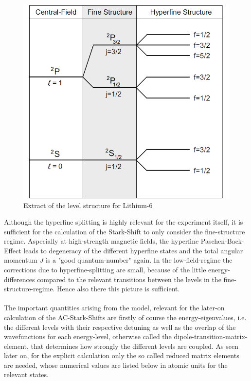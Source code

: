 \begin{figure}[H]

\begin{center}
\includegraphics[scale=.5] {levels1}
\end{center}
\caption{Extract of the level structure for Lithium-6 \cite{gehm}}

\end{figure}\label{levels1}
Although the hyperfine splitting is highly relevant for the experiment itself, it is sufficient for the calculation of the Stark-Shift to only consider the fine-structure regime. Aspecially at high-strength magnetic fields, the hyperfine Paschen-Back-Effect leads to degeneracy of the different hyperfine states and the total angular momentum $J$ is a "good quantum-number" again. In the low-field-regime the corrections due to hyperfine-splitting are small, because of the little energy-differences compared to the relevant transitions between the levels in the fine-structure-regime. Hence also there this picture is sufficient.\\\\
The important quantities arising from the model, relevant for the later-on calculation of the \textsc{AC}-Stark-Shifts are firstly of course the energy-eigenvalues, i.e. the different levels with their respective detuning as well as the overlap of the wavefunctions for each energy-level, otherwise called the dipole-transition-matrix-element, that determines how strongly the different levels are coupled. As seen later on, for the explicit calculation only the so called reduced matrix elements are needed, whose numerical values are listed below in atomic units for the relevant states.

